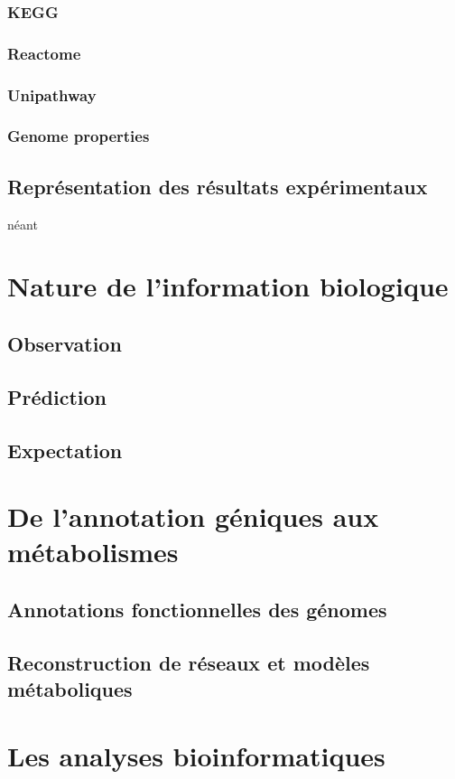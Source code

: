 \subsubsection{KEGG}
\subsubsection{Reactome}
\subsubsection{Unipathway}
\subsubsection{Genome properties}
\subsection{Représentation des résultats expérimentaux}
néant

\section{Nature de l'information biologique}
\subsection{Observation}
\subsection{Prédiction}
\subsection{Expectation}

\section{De l'annotation géniques aux métabolismes}
\subsection{Annotations fonctionnelles des génomes}
\subsection{Reconstruction de réseaux et modèles métaboliques}
\section{Les analyses bioinformatiques}

